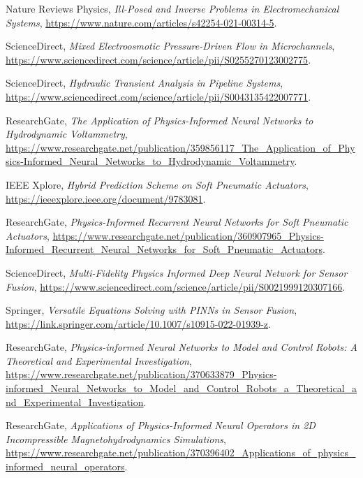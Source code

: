 \documentclass[12pt]{article}
\begin{document}
\begin{thebibliography}{9}
		Nature Reviews Physics,
		\textit{Ill-Posed and Inverse Problems in Electromechanical Systems},
		\url{https://www.nature.com/articles/s42254-021-00314-5}.
		
		ScienceDirect,
		\textit{Mixed Electroosmotic Pressure-Driven Flow in Microchannels},
		\url{https://www.sciencedirect.com/science/article/pii/S0255270123002775}.
		
		ScienceDirect,
		\textit{Hydraulic Transient Analysis in Pipeline Systems},
		\url{https://www.sciencedirect.com/science/article/pii/S0043135422007771}.
		
		ResearchGate,
		\textit{The Application of Physics-Informed Neural Networks to Hydrodynamic Voltammetry},
		\url{https://www.researchgate.net/publication/359856117_The_Application_of_Physics-Informed_Neural_Networks_to_Hydrodynamic_Voltammetry}.
		
		IEEE Xplore,
		\textit{Hybrid Prediction Scheme on Soft Pneumatic Actuators},
		\url{https://ieeexplore.ieee.org/document/9783081}.
		
		ResearchGate,
		\textit{Physics-Informed Recurrent Neural Networks for Soft Pneumatic Actuators},
		\url{https://www.researchgate.net/publication/360907965_Physics-Informed_Recurrent_Neural_Networks_for_Soft_Pneumatic_Actuators}.
		
		ScienceDirect,
		\textit{Multi-Fidelity Physics Informed Deep Neural Network for Sensor Fusion},
		\url{https://www.sciencedirect.com/science/article/pii/S0021999120307166}.
		
		Springer,
		\textit{Versatile Equations Solving with PINNs in Sensor Fusion},
		\url{https://link.springer.com/article/10.1007/s10915-022-01939-z}.
		
		ResearchGate,
		\textit{Physics-informed Neural Networks to Model and Control Robots: A Theoretical and Experimental Investigation},
		\url{https://www.researchgate.net/publication/370633879_Physics-informed_Neural_Networks_to_Model_and_Control_Robots_a_Theoretical_and_Experimental_Investigation}.
		
		ResearchGate,
		\textit{Applications of Physics-Informed Neural Operators in 2D Incompressible Magnetohydrodynamics Simulations},
		\url{https://www.researchgate.net/publication/370396402_Applications_of_physics_informed_neural_operators}.
		
		
	\end{thebibliography}
\end{document}
